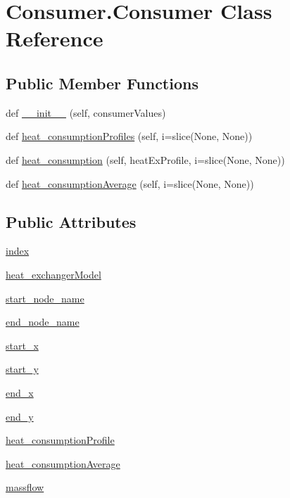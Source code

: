 \hypertarget{class_consumer_1_1_consumer}{}\section{Consumer.\+Consumer Class Reference}
\label{class_consumer_1_1_consumer}
\subsection*{Public Member Functions}
\begin{DoxyCompactItemize}
\item 
def \hyperlink{class_consumer_1_1_consumer_ac4c06a6de40e3415a3e11460a8430be3}{\+\_\+\+\_\+init\+\_\+\+\_\+} (self, consumer\+Values)
\item 
def \hyperlink{class_consumer_1_1_consumer_a50a2be7676f85149dfb01138fa779535}{heat\+\_\+consumption\+Profiles} (self, i=slice(None, None))
\item 
def \hyperlink{class_consumer_1_1_consumer_a25287e5a16d9185b04c419b8899d3380}{heat\+\_\+consumption} (self, heat\+Ex\+Profile, i=slice(None, None))
\item 
def \hyperlink{class_consumer_1_1_consumer_aaedec08d501a0d71638ba308c6b5902e}{heat\+\_\+consumption\+Average} (self, i=slice(None, None))
\end{DoxyCompactItemize}
\subsection*{Public Attributes}
\begin{DoxyCompactItemize}
\item 
\hyperlink{class_consumer_1_1_consumer_acada64c32e228cf283b639c05dca48da}{index}
\item 
\hyperlink{class_consumer_1_1_consumer_abecc1b73487aa5b5e7d01fa7df93194d}{heat\+\_\+exchanger\+Model}
\item 
\hyperlink{class_consumer_1_1_consumer_a7260abfc8da45b0de6dd3907e9f1d0c7}{start\+\_\+node\+\_\+name}
\item 
\hyperlink{class_consumer_1_1_consumer_ae5d2f6ddf475f4c856ba8953805f27d3}{end\+\_\+node\+\_\+name}
\item 
\hyperlink{class_consumer_1_1_consumer_a2b4e4c75066ac9e44f1c878608f5b8d6}{start\+\_\+x}
\item 
\hyperlink{class_consumer_1_1_consumer_a3e90aa467f71be63160bfa466e1c9d2b}{start\+\_\+y}
\item 
\hyperlink{class_consumer_1_1_consumer_abd46737be61b12a63808366b4c6611a3}{end\+\_\+x}
\item 
\hyperlink{class_consumer_1_1_consumer_a481d7ab91da5f55be5ba918adda5af36}{end\+\_\+y}
\item 
\hyperlink{class_consumer_1_1_consumer_a5154dfab3d485a066598b89122d38e26}{heat\+\_\+consumption\+Profile}
\item 
\hyperlink{class_consumer_1_1_consumer_aba14cee2b8276b8ae93a69a61015d5b5}{heat\+\_\+consumption\+Average}
\item 
\hyperlink{class_consumer_1_1_consumer_aad24a3c3e760d1c44fa98febaabeaf22}{massflow}
\end{DoxyCompactItemize}



